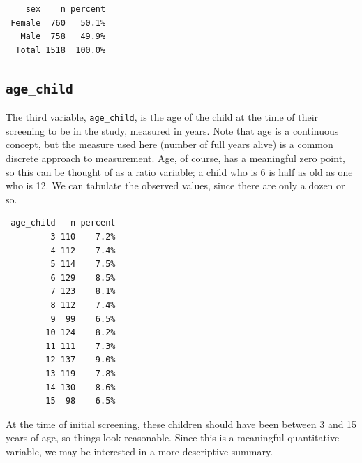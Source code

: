 \documentclass[
]{book}
\newenvironment{Shaded}{\begin{snugshade}}{\end{snugshade}}
\newcommand{\KeywordTok}[1]{\textcolor[rgb]{0.13,0.29,0.53}{\textbf{#1}}}
\newcommand{\NormalTok}[1]{#1}
\newcommand{\OperatorTok}[1]{\textcolor[rgb]{0.81,0.36,0.00}{\textbf{#1}}}
\newcommand{\StringTok}[1]{\textcolor[rgb]{0.31,0.60,0.02}{#1}}
\begin{document}
\begin{Shaded}
\end{Shaded}

\begin{verbatim}
    sex    n percent
 Female  760   50.1%
   Male  758   49.9%
  Total 1518  100.0%
\end{verbatim}

\hypertarget{age_child}{%
\subsection{\texorpdfstring{\texttt{age\_child}}{age\_child}}\label{age_child}}

The third variable, \texttt{age\_child}, is the age of the child at the time of their screening to be in the study, measured in years. Note that age is a continuous concept, but the measure used here (number of full years alive) is a common discrete approach to measurement. Age, of course, has a meaningful zero point, so this can be thought of as a ratio variable; a child who is 6 is half as old as one who is 12. We can tabulate the observed values, since there are only a dozen or so.

\begin{Shaded}
\end{Shaded}

\begin{verbatim}
 age_child   n percent
         3 110    7.2%
         4 112    7.4%
         5 114    7.5%
         6 129    8.5%
         7 123    8.1%
         8 112    7.4%
         9  99    6.5%
        10 124    8.2%
        11 111    7.3%
        12 137    9.0%
        13 119    7.8%
        14 130    8.6%
        15  98    6.5%
\end{verbatim}

At the time of initial screening, these children should have been between 3 and 15 years of age, so things look reasonable. Since this is a meaningful quantitative variable, we may be interested in a more descriptive summary.
\end{document}

